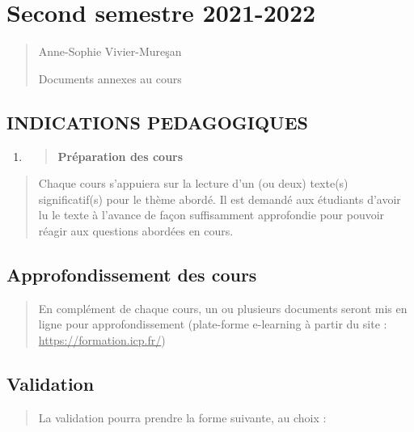 \hypertarget{second-semestre-2021-2022}{%
\section{Second semestre 2021-2022}\label{second-semestre-2021-2022}}

\begin{quote}
Anne-Sophie Vivier-Mureşan

Documents annexes au cours
\end{quote}

\hypertarget{indications-pedagogiques}{%
\subsection{INDICATIONS PEDAGOGIQUES}\label{indications-pedagogiques}}

\begin{enumerate}
\def\labelenumi{\arabic{enumi}.}
\item
  \begin{quote}
  \textbf{Préparation des cours}
  \end{quote}
\end{enumerate}

\begin{quote}
Chaque cours s'appuiera sur la lecture d'un (ou deux) texte(s)
significatif(s) pour le thème abordé. Il est demandé aux étudiants
d'avoir lu le texte à l'avance de façon suffisamment approfondie pour
pouvoir réagir aux questions abordées en cours.
\end{quote}

\hypertarget{approfondissement-des-cours}{%
\subsection{Approfondissement des
cours}\label{approfondissement-des-cours}}

\begin{quote}
En complément de chaque cours, un ou plusieurs documents seront mis en
ligne pour approfondissement (plate-forme e-learning à partir du site :
\underline{https://formation.icp.fr/})
\end{quote}

\hypertarget{validation}{%
\subsection{Validation}\label{validation}}

\begin{quote}
La validation pourra prendre la forme suivante, au choix :
\end{quote}

